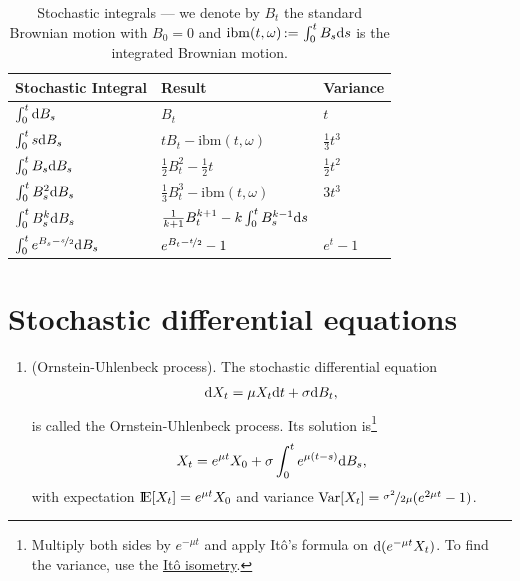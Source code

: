\documentclass[a4paper,10pt]{scrbook}
\begin{document}
\begin{table}[ht]
\caption{Stochastic integrals --- we denote by \(B_t\) the standard Brownian motion with \(B_0=0\)
         and \(\mathrm{ibm}(t, \omega) {}\mathop{\mathrel{:}=}{} \int_0^t B_s \mathrm{d} s\) is the integrated Brownian motion.}
\begin{center}
{
  \renewcommand{\arraystretch}{2.0}
  \begin{tabular}{ p{3cm} | p{4cm} | p{3cm}}  
  Stochastic Integral & Result & Variance\\ \hline
  \(\int_0^t \mathrm{d} B_s\) & \(B_t\) & $t$\\
  \(\int_0^t s \mathrm{d} B_s\) & \(tB_t - \mathrm{ibm}(t, \omega)\) & $\frac{1}{3}t^3$\\
  \(\int_0^t B_s \mathrm{d} B_s\) & \(\tfrac{1}{2} B_t^2 - \tfrac{1}{2}t\) & $\frac{1}{2}t^2$\\
  \(\int_0^t B_s^2 \mathrm{d} B_s\) & \(\tfrac{1}{3}B_t^3 - \mathrm{ibm}(t, \omega)\) & $3t^3$\\
  \(\int_0^t B_s^k \mathrm{d} B_s\) & \(\tfrac{1}{k+1}B_t^{k+1} - k \int_0^t B_s^{k-1}\mathrm{d} s \)\\
  \(\int_0^t e^{B_s - \nicefrac{s}{2}}\mathrm{d} B_s\) & \(e^{B_t - \nicefrac{t}{2}} - 1\) & \(e^{t}-1\) 
  \end{tabular}
}
\end{center}
\end{table}


\section{Stochastic differential equations}
\begin{enumerate}
 \item (Ornstein-Uhlenbeck process). The stochastic differential equation 
 \[
  \mathrm{d} X_t = \mu X_t \mathrm{d} t +  \sigma \mathrm{d} B_t,
 \]
 is called the Ornstein-Uhlenbeck process. Its solution is\footnote{Multiply both sides by 
   $e^{-\mu t}$ and apply Itô's formula on $\mathrm{d}(e^{-\mu t}X_t)$. To find the variance, use the 
   \hyperlink{link:ito-isometry}{It\^o isometry}.}
 \[
  X_t = e^{\mu t}X_0 + \sigma \int_0^t e^{\mu(t-s)}\mathrm{d} B_s,
 \]
 with expectation $\E[X_t] = e^{\mu t}X_0$ and variance $\operatorname{Var}[X_t]=\nicefrac{\sigma^2}{2\mu}(e^{2\mu t} - 1)$.


\end{enumerate}
\end{document}
